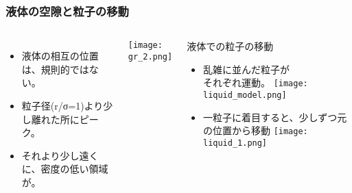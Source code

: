 \documentclass[12pt, dvipdfmx]{beamer}
\begin{document}
\begin{frame}
	\frametitle{液体の空隙と粒子の移動}
		\begin{columns}[T, onlytextwidth]
				\begin{itemize}
					\item 液体の相互の位置は、規則的ではない。
					\item 粒子径(r/σ=1)より少し離れた所にピーク。
					\item それより少し遠くに、密度の低い領域が。
				\end{itemize}
					\begin{center}
						\texttt{[image: gr\_2.png]}
					\end{center}
				\begin{exampleblock}{液体での粒子の移動}
					\begin{itemize}
						\item 乱雑に並んだ粒子が\\それぞれ運動。
						\texttt{[image: liquid\_model.png]}
						\item 一粒子に着目すると、少しずつ元の位置から移動
						\texttt{[image: liquid\_1.png]}
					\end{itemize}
				\end{exampleblock}
		\end{columns}
\end{frame}
\end{document}
